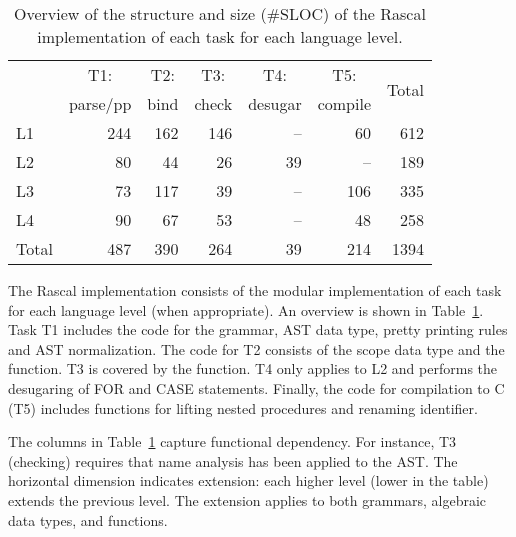 \begin{table}
\begin{center}\small
\begin{tabular}{|l||r|r|r|r|r||r|}\hline
      & \multicolumn{1}{c|}{T1:} 
      & \multicolumn{1}{c|}{T2:} 
      & \multicolumn{1}{c|}{T3:} 
      & \multicolumn{1}{c|}{T4:} 
      & \multicolumn{1}{c||}{T5:} & \multirow{2}{*}{Total}
       \\
  & parse/pp & bind & check & desugar & compile &
       \\\hline\hline
L1  &    244 & 162 & 146 &-- &   60 &  612   \\\hline
L2  &    80  & 44  & 26 & 39 &  --  &  189   \\\hline
L3  &    73  & 117 & 39 & -- &  106 &  335   \\\hline
L4  &    90  & 67  & 53 & -- & 48   &  258   \\\hline\hline
Total & 487  & 390 & 264 & 39 & 214 & 1394 \\\hline 
\end{tabular}
\end{center}
\caption{Overview of the structure and size (\#SLOC) of the Rascal implementation of each task for each language level.}
\label{TBL:rascalArtifacts}
\end{table}

\noindent The Rascal \oberon implementation consists of the modular implementation of each task for each language level (when appropriate). An overview is shown in Table~\ref{TBL:rascalArtifacts}. Task T1 includes the code for the grammar, AST data type, pretty printing rules and AST normalization. The code for T2 consists of the scope data type and the  function. T3 is covered by the  function. T4 only applies to L2 and performs the desugaring of FOR and CASE statements. Finally, the code for compilation to C (T5) includes functions for lifting nested procedures and renaming identifier. 

The columns in Table~\ref{TBL:rascalArtifacts} capture functional dependency. For instance, T3 (checking) requires that name analysis has been applied to the AST. The horizontal dimension indicates extension: each higher level (lower in the table) extends the previous level. The extension applies to both grammars, algebraic data types, and functions. 




